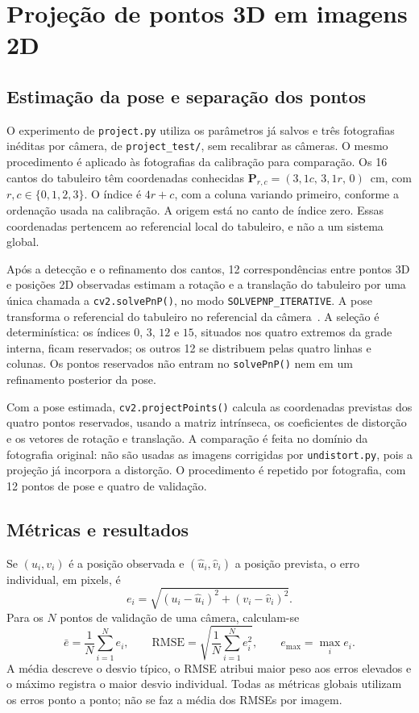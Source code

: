 \section{Projeção de pontos 3D em imagens 2D}

\subsection{Estimação da pose e separação dos pontos}

O experimento de \texttt{project.py} utiliza os parâmetros já salvos e três
fotografias inéditas por câmera, de \texttt{project\_test/}, sem recalibrar as
câmeras. O mesmo procedimento é aplicado às fotografias da calibração para
comparação. Os 16 cantos do tabuleiro têm coordenadas conhecidas
$\mathbf{P}_{r,c}=(3{,}1c,\,3{,}1r,\,0)$~cm, com $r,c\in\{0,1,2,3\}$.
O índice é $4r+c$, com a coluna variando primeiro, conforme a ordenação usada
na calibração. A origem está no canto de índice zero. Essas coordenadas
pertencem ao referencial local do tabuleiro, e não a um sistema global.

Após a detecção e o refinamento dos cantos, 12 correspondências entre pontos
3D e posições 2D observadas estimam a rotação e a translação do tabuleiro por
uma única chamada a \texttt{cv2.solvePnP()}, no modo
\texttt{SOLVEPNP\_ITERATIVE}. A pose transforma o referencial do tabuleiro no
referencial da câmera~\cite{opencv-calib3d}. A seleção é determinística: os
índices $0$, $3$, $12$ e $15$, situados nos quatro extremos da grade interna,
ficam reservados; os outros 12 se distribuem pelas quatro linhas e colunas.
Os pontos reservados não entram no \texttt{solvePnP()} nem em um refinamento
posterior da pose.

Com a pose estimada, \texttt{cv2.projectPoints()} calcula as coordenadas previstas
dos quatro pontos reservados, usando a matriz intrínseca, os coeficientes de
distorção e os vetores de rotação e translação. A comparação é feita no domínio
da fotografia original: não são usadas as imagens corrigidas por
\texttt{undistort.py}, pois a projeção já incorpora a distorção. O procedimento
é repetido por fotografia, com 12 pontos de pose e quatro de validação.

\subsection{Métricas e resultados}

Se $(u_i,v_i)$ é a posição observada e $(\hat{u}_i,\hat{v}_i)$ a posição
prevista, o erro individual, em pixels, é
\begin{equation}
e_i=\sqrt{(u_i-\hat{u}_i)^2+(v_i-\hat{v}_i)^2}.
\label{eq:error}
\end{equation}
Para os $N$ pontos de validação de uma câmera, calculam-se
\begin{equation}
\bar e=\frac{1}{N}\sum_{i=1}^{N}e_i,\qquad
\mathrm{RMSE}=\sqrt{\frac{1}{N}\sum_{i=1}^{N}e_i^2},\qquad
e_{\max}=\max_i e_i.
\label{eq:metrics}
\end{equation}
A média descreve o desvio típico, o RMSE atribui maior peso aos erros elevados
e o máximo registra o maior desvio individual. Todas as métricas globais
utilizam os erros ponto a ponto; não se faz a média dos RMSEs por imagem.

